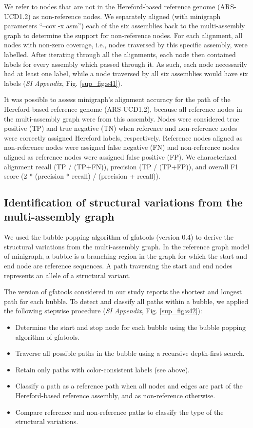 \documentclass[../main.tex]{subfiles}
\begin{document}
We refer to nodes that are not in the Hereford-based reference genome (ARS-UCD1.2) as non-reference nodes. We separately aligned (with minigraph parameters “--cov -x asm”) each of the six assemblies back to the multi-assembly graph to determine the support for non-reference nodes. For each alignment, all nodes with non-zero coverage, i.e., nodes traversed by this specific assembly, were labelled. After iterating through all the alignments, each node then contained labels for every assembly which passed through it. As such, each node necessarily had at least one label, while a node traversed by all six assemblies would have six labels (\emph{SI Appendix}, Fig. \ref{sup_fig:s41}).

It was possible to assess minigraph’s alignment accuracy for the path of the Hereford-based reference genome (ARS-UCD1.2), because all reference nodes in the multi-assembly graph were from this assembly. Nodes were considered true positive (TP) and true negative (TN) when reference and non-reference nodes were correctly assigned Hereford labels, respectively. Reference nodes aligned as non-reference nodes were assigned false negative (FN) and non-reference nodes aligned as reference nodes were assigned false positive (FP). We characterized alignment recall (TP / (TP+FN)), precision (TP / (TP+FP)), and overall F1 score (2 * (precision * recall) / (precision + recall)).

\subsection*{Identification of structural variations from the multi-assembly graph}

We used the bubble popping algorithm of gfatools (version 0.4) \citep{li2020design} to derive the structural variations from the multi-assembly graph. In the reference graph model of minigraph, a bubble is a branching region in the graph for which the start and end node are reference sequences. A path traversing the start and end nodes represents an allele of a structural variant. 

The version of gfatools considered in our study reports the shortest and longest path for each bubble. To detect and classify all paths within a bubble, we applied the following stepwise procedure (\emph{SI Appendix}, Fig. \ref{sup_fig:s42}):

\begin{itemize}
    \item Determine the start and stop node for each bubble using the bubble popping algorithm of gfatools.
    \item Traverse all possible paths in the bubble using a recursive depth-first search.
    \item Retain only paths with color-consistent labels (see above).
    \item Classify a path as a reference path when all nodes and edges are part of the Hereford-based reference assembly, and as non-reference otherwise.
    \item Compare reference and non-reference paths to classify the type of the structural variations.
\end{itemize}
\end{document}
